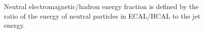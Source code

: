 \begin{figure}[hbtp]
  \centering
  \hspace{0.5cm}
  \caption{\label{fig:NeutralEF}Neutral electromagnetic/hadron energy fraction is defined by the ratio of the energy of neutral particles in ECAL/HCAL to the jet energy.}
\end{figure}

